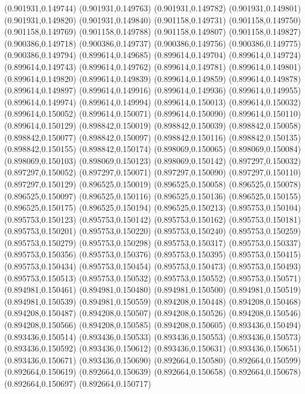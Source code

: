 (0.901931,0.149744)
(0.901931,0.149763)
(0.901931,0.149782)
(0.901931,0.149801)
(0.901931,0.149820)
(0.901931,0.149840)
(0.901158,0.149731)
(0.901158,0.149750)
(0.901158,0.149769)
(0.901158,0.149788)
(0.901158,0.149807)
(0.901158,0.149827)
(0.900386,0.149718)
(0.900386,0.149737)
(0.900386,0.149756)
(0.900386,0.149775)
(0.900386,0.149794)
(0.899614,0.149685)
(0.899614,0.149704)
(0.899614,0.149724)
(0.899614,0.149743)
(0.899614,0.149762)
(0.899614,0.149781)
(0.899614,0.149801)
(0.899614,0.149820)
(0.899614,0.149839)
(0.899614,0.149859)
(0.899614,0.149878)
(0.899614,0.149897)
(0.899614,0.149916)
(0.899614,0.149936)
(0.899614,0.149955)
(0.899614,0.149974)
(0.899614,0.149994)
(0.899614,0.150013)
(0.899614,0.150032)
(0.899614,0.150052)
(0.899614,0.150071)
(0.899614,0.150090)
(0.899614,0.150110)
(0.899614,0.150129)
(0.898842,0.150019)
(0.898842,0.150039)
(0.898842,0.150058)
(0.898842,0.150077)
(0.898842,0.150097)
(0.898842,0.150116)
(0.898842,0.150135)
(0.898842,0.150155)
(0.898842,0.150174)
(0.898069,0.150065)
(0.898069,0.150084)
(0.898069,0.150103)
(0.898069,0.150123)
(0.898069,0.150142)
(0.897297,0.150032)
(0.897297,0.150052)
(0.897297,0.150071)
(0.897297,0.150090)
(0.897297,0.150110)
(0.897297,0.150129)
(0.896525,0.150019)
(0.896525,0.150058)
(0.896525,0.150078)
(0.896525,0.150097)
(0.896525,0.150116)
(0.896525,0.150136)
(0.896525,0.150155)
(0.896525,0.150175)
(0.896525,0.150194)
(0.896525,0.150213)
(0.895753,0.150104)
(0.895753,0.150123)
(0.895753,0.150142)
(0.895753,0.150162)
(0.895753,0.150181)
(0.895753,0.150201)
(0.895753,0.150220)
(0.895753,0.150240)
(0.895753,0.150259)
(0.895753,0.150279)
(0.895753,0.150298)
(0.895753,0.150317)
(0.895753,0.150337)
(0.895753,0.150356)
(0.895753,0.150376)
(0.895753,0.150395)
(0.895753,0.150415)
(0.895753,0.150434)
(0.895753,0.150454)
(0.895753,0.150473)
(0.895753,0.150493)
(0.895753,0.150513)
(0.895753,0.150532)
(0.895753,0.150552)
(0.895753,0.150571)
(0.894981,0.150461)
(0.894981,0.150480)
(0.894981,0.150500)
(0.894981,0.150519)
(0.894981,0.150539)
(0.894981,0.150559)
(0.894208,0.150448)
(0.894208,0.150468)
(0.894208,0.150487)
(0.894208,0.150507)
(0.894208,0.150526)
(0.894208,0.150546)
(0.894208,0.150566)
(0.894208,0.150585)
(0.894208,0.150605)
(0.893436,0.150494)
(0.893436,0.150514)
(0.893436,0.150533)
(0.893436,0.150553)
(0.893436,0.150573)
(0.893436,0.150592)
(0.893436,0.150612)
(0.893436,0.150631)
(0.893436,0.150651)
(0.893436,0.150671)
(0.893436,0.150690)
(0.892664,0.150580)
(0.892664,0.150599)
(0.892664,0.150619)
(0.892664,0.150639)
(0.892664,0.150658)
(0.892664,0.150678)
(0.892664,0.150697)
(0.892664,0.150717)
